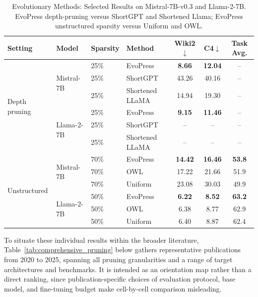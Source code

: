 \begin{table}[H]
	\centering
	\caption{Evolutionary Methods: Selected Results on Mistral-7B-v0.3 and Llama-2-7B. EvoPress depth-pruning versus ShortGPT and Shortened Llama; EvoPress unstructured sparsity versus Uniform and OWL.}
	\label{tab:search_summary}
	\begin{tabular}{@{}llllccc@{}}
		\toprule
		\textbf{Setting} & \textbf{Model} & \textbf{Sparsity} & \textbf{Method} & \textbf{Wiki2$\downarrow$} & \textbf{C4$\downarrow$} & \textbf{Task Avg.} \\
		\midrule
		\multirow{6}{*}{Depth pruning}
		  & \multirow{3}{*}{Mistral-7B} & 25\% & EvoPress      & \textbf{8.66}  & \textbf{12.04} & -- \\
		  &                             & 25\% & ShortGPT      & 43.26 & 40.16 & -- \\
		  &                             & 25\% & Shortened LLaMA & 14.94 & 19.30 & -- \\
		  \cmidrule{2-7}
		  & \multirow{3}{*}{Llama-2-7B} & 25\% & EvoPress      & \textbf{9.15}  & \textbf{11.46} & -- \\
		  &                              & 25\% & ShortGPT      & -- & -- & -- \\
		  &                              & 25\% & Shortened LLaMA & -- & -- & -- \\
		\midrule
		\multirow{6}{*}{Unstructured}
		  & \multirow{3}{*}{Mistral-7B} & 70\% & EvoPress  & \textbf{14.42} & \textbf{16.46} & \textbf{53.8} \\
		  &                             & 70\% & OWL       & 17.22 & 21.66 & 51.9 \\
		  &                             & 70\% & Uniform   & 23.08 & 30.03 & 49.9 \\
		  \cmidrule{2-7}
		  & \multirow{3}{*}{Llama-2-7B} & 50\% & EvoPress & \textbf{6.22}  & \textbf{8.52}  & \textbf{63.2} \\
		  &                              & 50\% & OWL      & 6.38  & 8.77  & 62.9 \\
		  &                              & 50\% & Uniform  & 6.40  & 8.87  & 62.4 \\
		\bottomrule
	\end{tabular}
\end{table}

To situate these individual results within the broader literature, Table~\ref{tab:comprehensive_pruning} below gathers representative publications from 2020 to 2025, spanning all pruning granularities and a range of target architectures and benchmarks. It is intended as an orientation map rather than a direct ranking, since publication-specific choices of evaluation protocol, base model, and fine-tuning budget make cell-by-cell comparison misleading.

